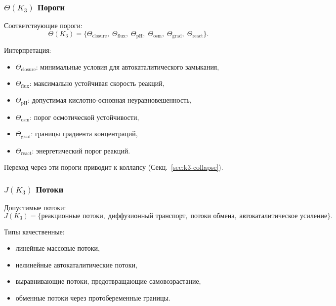 \subsubsection{\texorpdfstring{$\Theta(K_3)$}{\Theta(K_3)} Пороги}

Соответствующие пороги:
\[
\Theta(K_3) =
\{\Theta_{\mathrm{closure}},\;
  \Theta_{\mathrm{flux}},\;
  \Theta_{\mathrm{pH}},\;
  \Theta_{\mathrm{osm}},\;
  \Theta_{\mathrm{grad}},\;
  \Theta_{\mathrm{react}}\}.
\]

Интерпретация:
\begin{itemize}
    \item $\Theta_{\mathrm{closure}}$: минимальные условия для
          автокаталитического замыкания,
    \item $\Theta_{\mathrm{flux}}$: максимально устойчивая скорость реакций,
    \item $\Theta_{\mathrm{pH}}$: допустимая кислотно-основная
          неуравновешенность,
    \item $\Theta_{\mathrm{osm}}$: порог осмотической устойчивости,
    \item $\Theta_{\mathrm{grad}}$: границы градиента концентраций,
    \item $\Theta_{\mathrm{react}}$: энергетический порог реакций.
\end{itemize}

Переход через эти пороги приводит к коллапсу (Секц.~\ref{sec:k3-collapse}).

\subsubsection{\texorpdfstring{$J(K_3)$}{J(K_3)} Потоки}

Допустимые потоки:
\[
J(K_3) = \{\text{реакционные потоки},\; \text{диффузионный транспорт},\;
         \text{потоки обмена},\; \text{автокаталитическое усиление}\}.
\]

Типы качественные:
\begin{itemize}
    \item линейные массовые потоки,
    \item нелинейные автокаталитические потоки,
    \item выравнивающие потоки, предотвращающие самовозрастание,
    \item обменные потоки через протобеременные границы.
\end{itemize}

